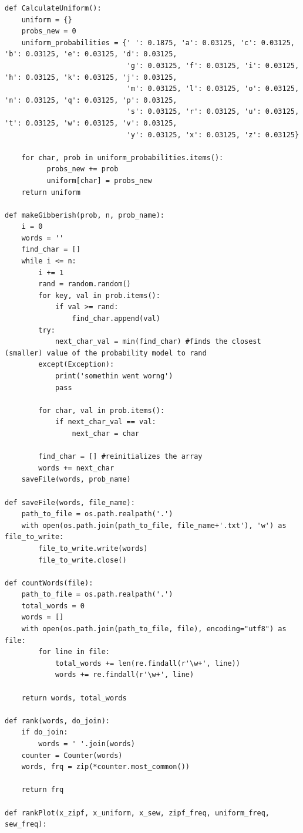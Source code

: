\documentclass{WeSTassignment}
\begin{document}
\begin{lstlisting}
def CalculateUniform():
    uniform = {}
    probs_new = 0
    uniform_probabilities = {' ': 0.1875, 'a': 0.03125, 'c': 0.03125, 'b': 0.03125, 'e': 0.03125, 'd': 0.03125,
                             'g': 0.03125, 'f': 0.03125, 'i': 0.03125, 'h': 0.03125, 'k': 0.03125, 'j': 0.03125,
                             'm': 0.03125, 'l': 0.03125, 'o': 0.03125, 'n': 0.03125, 'q': 0.03125, 'p': 0.03125,
                             's': 0.03125, 'r': 0.03125, 'u': 0.03125, 't': 0.03125, 'w': 0.03125, 'v': 0.03125,
                             'y': 0.03125, 'x': 0.03125, 'z': 0.03125}

    for char, prob in uniform_probabilities.items():
          probs_new += prob
          uniform[char] = probs_new
    return uniform

def makeGibberish(prob, n, prob_name):
    i = 0
    words = ''
    find_char = []
    while i <= n:
        i += 1
        rand = random.random()
        for key, val in prob.items():
            if val >= rand:
                find_char.append(val)
        try:
            next_char_val = min(find_char) #finds the closest (smaller) value of the probability model to rand
        except(Exception):
            print('somethin went worng')
            pass

        for char, val in prob.items():
            if next_char_val == val:
                next_char = char

        find_char = [] #reinitializes the array
        words += next_char
    saveFile(words, prob_name)

def saveFile(words, file_name):
    path_to_file = os.path.realpath('.')
    with open(os.path.join(path_to_file, file_name+'.txt'), 'w') as file_to_write:
        file_to_write.write(words)
        file_to_write.close()

def countWords(file):
    path_to_file = os.path.realpath('.')
    total_words = 0
    words = []
    with open(os.path.join(path_to_file, file), encoding="utf8") as file:
        for line in file:
            total_words += len(re.findall(r'\w+', line))
            words += re.findall(r'\w+', line)

    return words, total_words

def rank(words, do_join):
    if do_join:
        words = ' '.join(words)
    counter = Counter(words)
    words, frq = zip(*counter.most_common())

    return frq

def rankPlot(x_zipf, x_uniform, x_sew, zipf_freq, uniform_freq, sew_freq):


\end{lstlisting}
\end{document}
